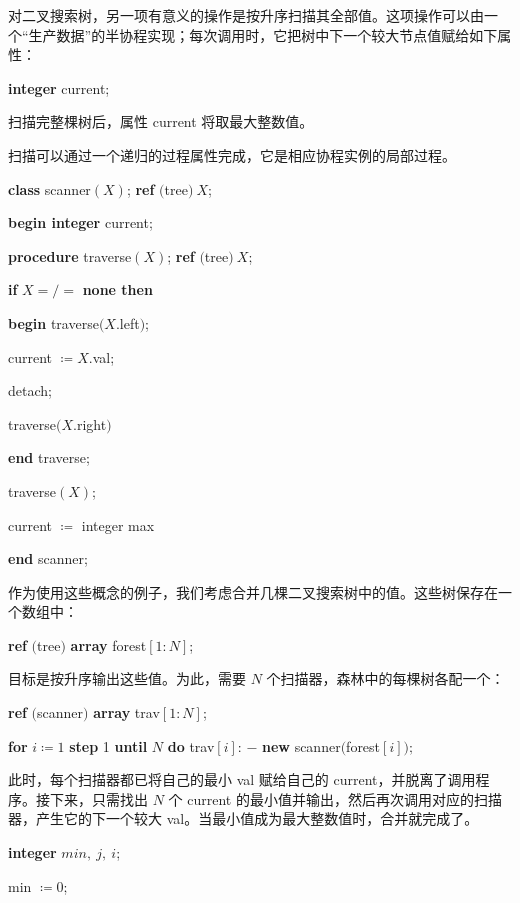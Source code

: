 对二叉搜索树，另一项有意义的操作是按升序扫描其全部值。这项操作可以由一个“生产数据”的半协程实现；每次调用时，它把树中下一个较大节点值赋给如下属性：

\quad \textbf{integer} current;

\noindent
扫描完整棵树后，属性 current 将取最大整数值。

扫描可以通过一个递归的过程属性完成，它是相应协程实例的局部过程。

\quad \textbf{class} scanner$(X)$; \textbf{ref} $($tree$)\ X$;

\quad \quad \textbf{begin integer} current;

\quad \quad \quad \textbf{procedure} traverse$(X)$; \textbf{ref} $($tree$)\ X$;

\quad \quad \quad \quad \textbf{if} $X =/=$ \textbf{none then}

\quad \quad \quad \quad \quad \textbf{begin} traverse$(X$.left$)$;

\quad \quad \quad \quad \quad \quad current $\coloneq X$.val;

\quad \quad \quad \quad \quad \quad detach;

\quad \quad \quad \quad \quad \quad traverse$(X$.right$)$

\quad \quad \quad \quad \quad \textbf{end} traverse;

\quad \quad \quad traverse$(X)$;

\quad \quad \quad current $\coloneq$ integer max

\quad \quad \textbf{end} scanner;

作为使用这些概念的例子，我们考虑合并几棵二叉搜索树中的值。这些树保存在一个数组中：

\quad \textbf{ref} $($tree$)$ \textbf{array} forest$[1: N]$;

\noindent
目标是按升序输出这些值。为此，需要 $N$ 个扫描器，森林中的每棵树各配一个：

\quad \textbf{ref} $($scanner$)$ \textbf{array} trav$[1: N]$;

\quad \textbf{for} $i\coloneq 1$ \textbf{step} 1 \textbf{until} $N$ \textbf{do} trav$[i]$: $-$ \textbf{new} scanner$($forest$[i]);$

\noindent
此时，每个扫描器都已将自己的最小 val 赋给自己的 current，并脱离了调用程序。接下来，只需找出 $N$ 个 current 的最小值并输出，然后再次调用对应的扫描器，产生它的下一个较大 val。当最小值成为最大整数值时，合并就完成了。

\quad \textbf{integer} $min,\ j,\ i$;

\quad min $\coloneq 0$;

